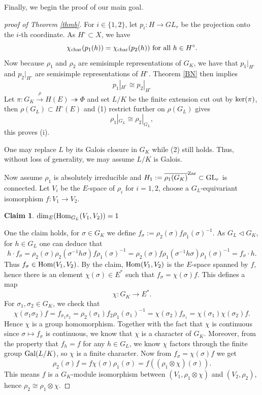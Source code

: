 \documentclass[20pt, oneside]{article}   	%
\newtheorem*{claim*}{Claim}
\theoremstyle{definition}
\newcommand{\GL}{\mathrm{GL}}
\begin{document}
Finally, we begin the proof of our main goal.
\begin{proof}[proof of Theorem \ref{thmb}]

For $i\in\{1,2\}$, let $p_i:H\rightarrow GL_r$ be the projection onto the $i$-th coordinate. As $H^\circ\subset X$, we have 
$$\chi_{\rm char}(p_1(h))=\chi_{\rm char}(p_2(h))\ \textrm{for all }h\in H^\circ.$$
Now because $\rho_1$ and $\rho_2$ are semisimple  representations of $G_K$, we have that $p_1|_{H^\circ}$ and $p_2|_{H^\circ}$ are semisimple representations of $H^\circ$. Theorem \ref{BN} then implies 
\begin{equation}\tag{1}
p_1|_{H^\circ}\cong p_2|_{H^\circ}
\end{equation}
Let $\pi:G_K\xrightarrow{\rho}H(E)\twoheadrightarrow \Phi$ and set $L/K$ be the finite extension cut out by ${\rm ker}(\pi)$, then $\rho(G_L)\subset H^\circ(E)$ and (1) restrict further on $\rho(G_L)$ gives 
\begin{equation}\tag{2}
\rho_1|_{G_L}\cong\rho_2|_{G_L},
\end{equation}
this proves (i).

One may replace $L$ by its Galois closure in $G_K$ while (2) still holds. Thus, without loss of generality, we may assume $L/K$ is Galois.

Now assume $\rho_1$ is absolutely irreducible and $H_1:=\overline{\rho_1(G_K)}^{\rm Zar}\subset \GL_r$ is connected. Let $V_i$ be the $E$-space of $\rho_i$ for $i=1,2$, choose a $G_L$-equivariant isomorphism $f:V_1\rightarrow V_2$. 

\begin{claim*}
${\rm dim}_E({\rm Hom}_{G_L}(V_1,V_2))=1$
\end{claim*}

One the claim holds, for $\sigma\in G_K$ we define $f_\sigma:=\rho_2(\sigma)f\rho_1(\sigma)^{-1}$. As $G_L\lhd G_K$, for $h\in G_L$ one can deduce that
$$h\cdot f_\sigma=\rho_2(\sigma)\rho_2(\sigma^{-1}h\sigma)f\rho_1(\sigma)^{-1}=\rho_2(\sigma)f\rho_1(\sigma^{-1}h\sigma)\rho_1(\sigma)^{-1}=f_\sigma\cdot h.$$
Thus $f_\sigma\in {\rm Hom}(V_1,V_2)$. By the claim, ${\rm Hom}(V_1,V_2)$ is the $E$-space spanned by $f$, hence there is an element $\chi(\sigma)\in E^*$ such that $f_\sigma=\chi(\sigma)f$. This defines a map
$$\chi:G_K\rightarrow E^*.$$
For $\sigma_1,\sigma_2\in G_K$, we check that 
$$\chi(\sigma_1\sigma_2)f=f_{\sigma_1\sigma_2}=\rho_2(\sigma_1)f_2\rho_1(\sigma_1)^{-1}=\chi(\sigma_2)f_{\sigma_1}=\chi(\sigma_1)\chi(\sigma_2)f.$$
Hence $\chi$ is a group homomorphism. Together with the fact that $\chi$ is continuous since $\sigma\mapsto f_\sigma$ is continuous, we know that $\chi$ is a character of $G_K$.  Moreover, from the property that $f_h=f$ for any $h\in G_L$, we know $\chi$ factors through the finite group ${\rm Gal}(L/K)$, so $\chi$ is a finite character.
Now from $f_\sigma=\chi(\sigma)f$ we get 
$$\rho_2(\sigma)f=f\chi(\sigma)\rho_1(\sigma)=f((\rho_1\otimes\chi)(\sigma)).$$
This means $f$ is a $G_K$-module isomorphism between $(V_1,\rho_1\otimes\chi)$ and $(V_2,\rho_2)$, hence $\rho_2\cong\rho_1\otimes\chi$.


\end{proof}
\end{document}
